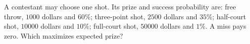 A contestant may choose one shot. Its prize and success probability are: free throw, $1000$ dollars and $60\%$; three-point shot, $2500$ dollars and $35\%$; half-court shot, $10000$ dollars and $10\%$; full-court shot, $50000$ dollars and $1\%$. A miss pays zero. Which maximizes expected prize?
